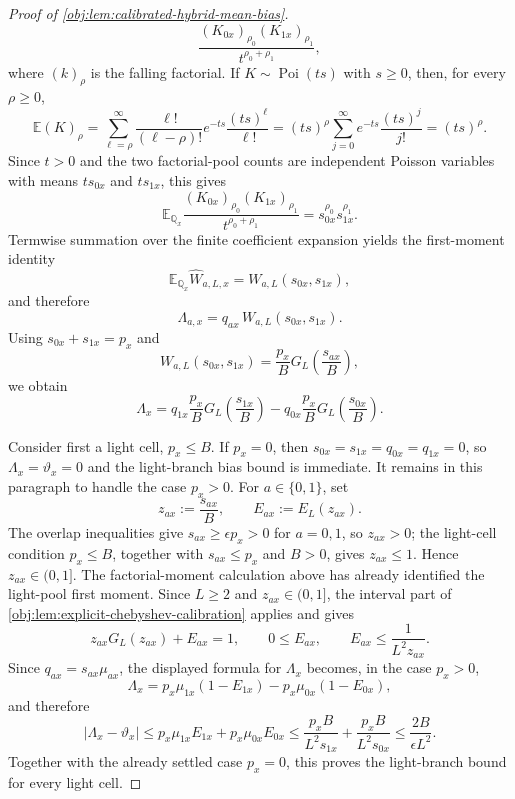 \begin{proof}[Proof of \cref{obj:lem:calibrated-hybrid-mean-bias}]
\[\frac{(K_{0x})_{\rho_0}(K_{1x})_{\rho_1}}
     {t^{\rho_0+\rho_1}},
\]
where \((k)_\rho\) is the falling factorial.  If \(K\sim\operatorname{Poi}(ts)\) with \(s\ge0\), then, for every \(\rho\ge0\),
\[
\mathbb E (K)_\rho
=
\sum_{\ell=\rho}^\infty
\frac{\ell!}{(\ell-\rho)!}
 e^{-ts}\frac{(ts)^\ell}{\ell!}
=(ts)^\rho
\sum_{j=0}^\infty e^{-ts}\frac{(ts)^j}{j!}
=(ts)^\rho.
\]
Since \(t>0\) and the two factorial-pool counts are independent Poisson variables with means \(t s_{0x}\) and \(t s_{1x}\), this gives
\[
\mathbb E_{\mathbb Q_x}
\frac{(K_{0x})_{\rho_0}(K_{1x})_{\rho_1}}
     {t^{\rho_0+\rho_1}}
=s_{0x}^{\rho_0}s_{1x}^{\rho_1}.
\]
Termwise summation over the finite coefficient expansion yields the first-moment identity
\[
\mathbb E_{\mathbb Q_x}\widehat W_{a,L,x}=W_{a,L}(s_{0x},s_{1x}),
\]
and therefore
\[
\Lambda_{a,x}
=q_{ax}\,W_{a,L}(s_{0x},s_{1x}).
\]
Using \(s_{0x}+s_{1x}=p_x\) and
\[
W_{a,L}(s_{0x},s_{1x})
=
\frac{p_x}{B}G_L\!\left(\frac{s_{ax}}B\right),
\]
we obtain
\[
\Lambda_x
=
q_{1x}\frac{p_x}{B}G_L\!\left(\frac{s_{1x}}B\right)
-
q_{0x}\frac{p_x}{B}G_L\!\left(\frac{s_{0x}}B\right).
\]

Consider first a light cell, \(p_x\le B\).  If \(p_x=0\), then \(s_{0x}=s_{1x}=q_{0x}=q_{1x}=0\), so \(\Lambda_x=\vartheta_x=0\) and the light-branch bias bound is immediate.  It remains in this paragraph to handle the case \(p_x>0\).  For \(a\in\{0,1\}\), set
\[
z_{ax}:=\frac{s_{ax}}B,
\qquad
E_{ax}:=E_L(z_{ax}).
\]
The overlap inequalities give \(s_{ax}\ge\epsilon p_x>0\) for \(a=0,1\), so \(z_{ax}>0\); the light-cell condition \(p_x\le B\), together with \(s_{ax}\le p_x\) and \(B>0\), gives \(z_{ax}\le1\).  Hence \(z_{ax}\in(0,1]\).  The factorial-moment calculation above has already identified the light-pool first moment.  Since \(L\ge2\) and \(z_{ax}\in(0,1]\), the interval part of \cref{obj:lem:explicit-chebyshev-calibration} applies and gives
\[
z_{ax}G_L(z_{ax})+E_{ax}=1,
\qquad
0\le E_{ax},
\qquad
E_{ax}\le\frac{1}{L^2z_{ax}} .
\]  Since
\(q_{ax}=s_{ax}\mu_{ax}\), the displayed formula for \(\Lambda_x\) becomes, in the case \(p_x>0\),
\[
\Lambda_x
=
p_x\mu_{1x}(1-E_{1x})
-
p_x\mu_{0x}(1-E_{0x}),
\]
and therefore
\[
|\Lambda_x-\vartheta_x|
\le
p_x\mu_{1x}E_{1x}+p_x\mu_{0x}E_{0x}
\le
\frac{p_xB}{L^2s_{1x}}+\frac{p_xB}{L^2s_{0x}}
\le
\frac{2B}{\epsilon L^2}.
\]
Together with the already settled case \(p_x=0\), this proves the light-branch bound for every light cell. %


\end{proof}
